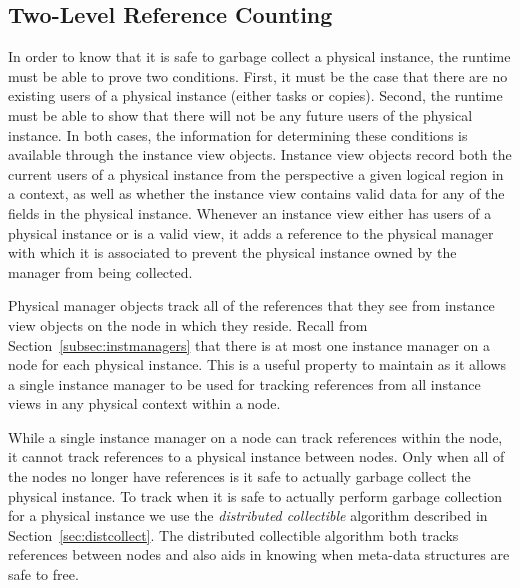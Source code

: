 \subsection{Two-Level Reference Counting}
\label{subsec:twolevel}
In order to know that it is safe to garbage
collect a physical instance, the runtime must be
able to prove two conditions.  First, it must
be the case that there are no existing users of
a physical instance (either tasks or copies).
Second, the runtime must be able to show that 
there will not be any future users of the physical
instance. In both cases, the information for 
determining these conditions is available through
the instance view objects.  Instance view objects
record both the current users of a physical instance
from the perspective a given logical region in 
a context, as well as whether the instance view
contains valid data for any of the fields in the 
physical instance. Whenever an instance view either
has users of a physical instance or is a valid 
view, it adds a reference to the physical manager
with which it is associated to prevent the physical
instance owned by the manager from being collected.

Physical manager objects track all of the references
that they see from instance view objects on the node
in which they reside.  Recall from 
Section~\ref{subsec:instmanagers} that there is at
most one instance manager on a node for each
physical instance. This is a useful property to maintain
as it allows a single instance manager to be used
for tracking references from all instance views in
any physical context within a node. 

While a single instance manager on a node can track
references within the node, it cannot track references
to a physical instance between nodes. Only when all of
the nodes no longer have references is it safe to 
actually garbage collect the physical instance. To track
when it is safe to actually perform garbage collection
for a physical instance we use the {\em distributed
collectible} algorithm described in 
Section~\ref{sec:distcollect}. The distributed collectible
algorithm both tracks references between nodes and 
also aids in knowing when meta-data structures are safe
to free.

